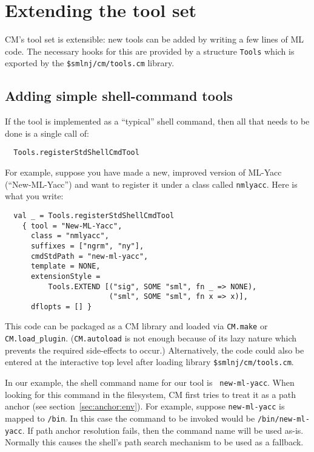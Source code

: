 %

\section{Extending the tool set}
\label{sec:moretools}

CM's tool set is extensible: new tools can be added by writing a few
lines of ML code.  The necessary hooks for this are provided by a
structure {\tt Tools} which is exported by the {\tt \$smlnj/cm/tools.cm}
library.

\subsection{Adding simple shell-command tools}
\label{sec:addshellclass}

If the tool is implemented as a ``typical'' shell command, then all
that needs to be done is a single call of:

\begin{verbatim}
  Tools.registerStdShellCmdTool
\end{verbatim}

For example, suppose you have made a
new, improved version of ML-Yacc (``New-ML-Yacc'') and want to
register it under a class called {\tt nmlyacc}.  Here is what you
write:

\begin{verbatim}
  val _ = Tools.registerStdShellCmdTool
    { tool = "New-ML-Yacc",
      class = "nmlyacc",
      suffixes = ["ngrm", "ny"],
      cmdStdPath = "new-ml-yacc",
      template = NONE,
      extensionStyle =
          Tools.EXTEND [("sig", SOME "sml", fn _ => NONE),
                        ("sml", SOME "sml", fn x => x)],
      dflopts = [] }
\end{verbatim}

This code can be packaged as a CM library and loaded via {\tt CM.make}
or {\tt CM.load\_plugin}.  ({\tt CM.autoload} is not enough because of
its lazy nature which prevents the required side-effects to occur.)
Alternatively, the code could also be entered at the interactive top
level after loading library {\tt \$smlnj/cm/tools.cm}.

In our example, the shell command name for our tool is {\tt
new-ml-yacc}.  When looking for this command in the filesystem, CM
first tries to treat it as a path anchor (see
section~\ref{sec:anchor:env}).  For example, suppose {\tt new-ml-yacc} is
mapped to {\tt /bin}.  In this case the command to be
invoked would be {\tt /bin/new-ml-yacc}.  If path anchor resolution
fails, then the command name will be used as-is.  Normally this
causes the shell's path search mechanism to be used as a fallback.

